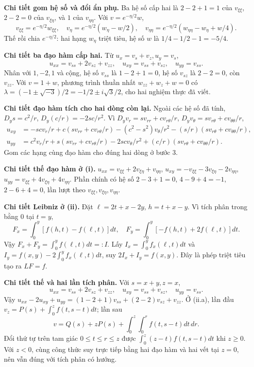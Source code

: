 \textbf{Chi tiết gom hệ số và đổi ẩn phụ.} Ba hệ số cấp hai là $2-2+1=1$ của $v_{\xi\xi}$, $2-2=0$ của $v_{\xi\eta}$, và $1$ của $v_{\eta\eta}$. Với $v=e^{-\eta/2}w$,
\[v_{\xi\xi}=e^{-\eta/2}w_{\xi\xi},\quad v_\eta=e^{-\eta/2}(w_\eta-w/2),\quad
v_{\eta\eta}=e^{-\eta/2}(w_{\eta\eta}-w_\eta+w/4).\]
Thế rồi chia $e^{-\eta/2}$: hai hạng $w_\eta$ triệt tiêu, hệ số $w$ là $1/4-1/2-1=-5/4$.

\textbf{Chi tiết ba đạo hàm cấp hai.} Từ $u_x=v_s+v_z,u_y=v_s$,
\[u_{xx}=v_{ss}+2v_{sz}+v_{zz},\quad u_{xy}=v_{ss}+v_{sz},\quad u_{yy}=v_{ss}.\]
Nhân với $1,-2,1$ và cộng, hệ số $v_{ss}$ là $1-2+1=0$, hệ số $v_{sz}$ là $2-2=0$, còn $v_{zz}$. Với $v=1+w$, phương trình thuần nhất $w_{zz}+w_z+w=0$ có $\lambda=(-1\pm\sqrt{-3})/2=-1/2\pm i\sqrt3/2$, cho hai nghiệm thực đã viết.

\textbf{Chi tiết đạo hàm tích cho hai dòng còn lại.} Ngoài các hệ số đã tính, $D_ys=c^2/r$, $D_y(c/r)=-2sc/r^2$. Vì $D_yv_r=sv_{rr}+cv_{r\theta}/r$, $D_yv_\theta=sv_{r\theta}+cv_{\theta\theta}/r$,
\[\begin{aligned}
u_{xy}&=-scv_r/r+c(sv_{rr}+cv_{r\theta}/r)
-(c^2-s^2)v_\theta/r^2-(s/r)(sv_{r\theta}+cv_{\theta\theta}/r),\\
u_{yy}&=c^2v_r/r+s(sv_{rr}+cv_{r\theta}/r)
-2scv_\theta/r^2+(c/r)(sv_{r\theta}+cv_{\theta\theta}/r).
\end{aligned}\]
Gom các hạng cùng đạo hàm cho đúng hai dòng ở bước 3.

\textbf{Chi tiết thế đạo hàm ở (i).} $u_{xx}=v_{\xi\xi}+2v_{\xi\eta}+v_{\eta\eta}$, $u_{xy}=-v_{\xi\xi}-3v_{\xi\eta}-2v_{\eta\eta}$, $u_{yy}=v_{\xi\xi}+4v_{\xi\eta}+4v_{\eta\eta}$. Phần chính có hệ số $2-3+1=0$, $4-9+4=-1$, $2-6+4=0$, lần lượt theo $v_{\xi\xi},v_{\xi\eta},v_{\eta\eta}$.

\textbf{Chi tiết Leibniz ở (ii).} Đặt $\ell=2t+x-2y$, $h=t+x-y$. Vì tích phân trong bằng $0$ tại $t=y$,
\[F_x=\int_0^y[f(h,t)-f(\ell,t)]dt,\quad
F_y=\int_0^y[-f(h,t)+2f(\ell,t)]dt.\]
Vậy $F_x+F_y=\int_0^yf(\ell,t)dt=:I$. Lấy $I_x=\int_0^yf_x(\ell,t)dt$ và $I_y=f(x,y)-2\int_0^yf_x(\ell,t)dt$, suy $2I_x+I_y=f(x,y)$. Đây là phép triệt tiêu tạo ra $LF=f$.

\textbf{Chi tiết thế và hai lần tích phân.} Với $s=x+y,z=x$,
\[u_{xx}=v_{ss}+2v_{sz}+v_{zz},\quad u_{xy}=v_{ss}+v_{sz},\quad u_{yy}=v_{ss}.\]
Vậy $u_{xx}-2u_{xy}+u_{yy}=(1-2+1)v_{ss}+(2-2)v_{sz}+v_{zz}$. Ở (ii.a), lần đầu $v_z=P(s)+\int_0^zf(t,s-t)dt$; lần sau
\[v=Q(s)+zP(s)+\int_0^z\int_0^r f(t,s-t)dt\,dr.\]
Đổi thứ tự trên tam giác $0\le t\le r\le z$ được $\int_0^z(z-t)f(t,s-t)dt$ khi $z\ge0$. Với $z<0$, cùng công thức suy trực tiếp bằng hai đạo hàm và hai vết tại $z=0$, nên vẫn đúng với tích phân có hướng.

